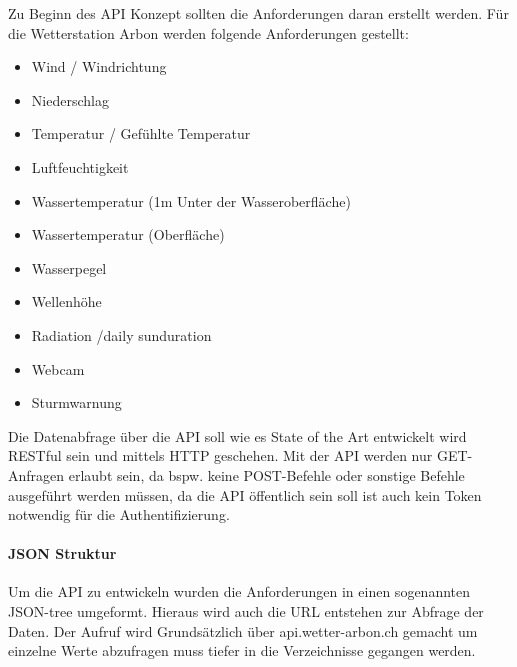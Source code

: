 Zu Beginn des API Konzept sollten die Anforderungen daran erstellt werden. Für die Wetterstation Arbon werden folgende Anforderungen gestellt:
\begin{itemize}
\item Wind / Windrichtung
\item Niederschlag
\item Temperatur / Gefühlte Temperatur
\item Luftfeuchtigkeit
\item Wassertemperatur (1m Unter der Wasseroberfläche)
\item Wassertemperatur (Oberfläche)
\item Wasserpegel
\item Wellenhöhe
\item Radiation /daily sunduration
\item Webcam
\item Sturmwarnung
\end{itemize}
Die Datenabfrage über die API soll wie es State of the Art entwickelt wird RESTful sein und mittels HTTP geschehen. Mit der API werden nur GET-Anfragen erlaubt sein, da bspw. keine POST-Befehle oder sonstige Befehle ausgeführt werden müssen, da die API öffentlich sein soll ist auch kein Token notwendig für die Authentifizierung.

\paragraph{JSON Struktur}

Um die API zu entwickeln wurden die Anforderungen in einen sogenannten JSON-tree umgeformt. Hieraus wird auch die URL entstehen zur Abfrage der Daten. Der Aufruf wird Grundsätzlich über api.wetter-arbon.ch gemacht um einzelne Werte abzufragen muss tiefer in die Verzeichnisse gegangen werden. 

